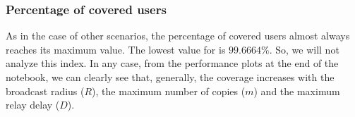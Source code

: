 \subsubsection{Percentage of covered users}\label{subsubsec:rect2krcoverage}

As in the case of other scenarios, the percentage of covered users almost always
reaches its maximum value. The lowest value for is \(99.6664\%\). So, we will
not analyze this index. In any case, from the performance plots at the end of
the notebook, we can clearly see that, generally, the coverage increases with
the broadcast radius (\(R\)), the maximum number of copies (\(m\)) and the
maximum relay delay (\(D\)).
